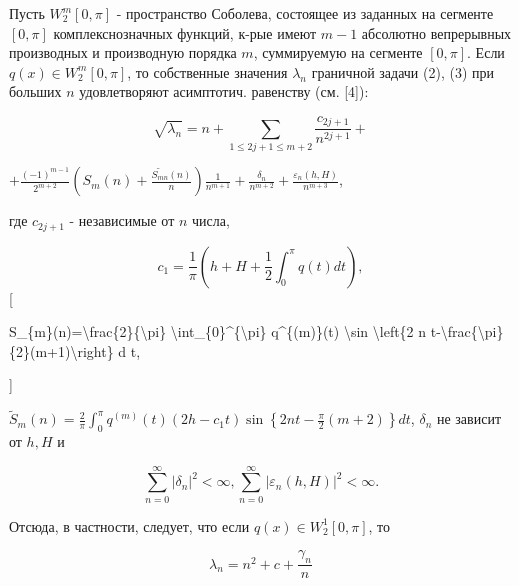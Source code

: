\documentclass[10pt]{article}
\begin{document}
Пусть $W_{2}^{m}[0, \pi]$ - пространство Соболева, состоящее из заданных на сегменте $[0, \pi]$ комплекснозначных функций, к-рые имеют $m-1$ абсолютно вепрерывных производных и производную порядка $m$, суммируемую на сегменте $[0, \pi]$. Если $q(x) \in W_{2}^{m}[0, \pi]$, то собственные значения $\lambda_{n}$ граничной задачи (2), (3) при больших $n$ удовлетворяют асимптотич. равенству (см. [4]):



\[

\sqrt{\lambda_{n}}=n+\sum_{1 \leqslant 2 j+1 \leqslant m+2} \frac{c_{2 j+1}}{n^{2 j+1}}+

\]



$+\frac{(-1)^{m-1}}{2^{m+2}}\left(S_{m}(n)+\frac{\tilde{S_{m n}}(n)}{n}\right) \frac{1}{n^{m+1}}+\frac{\delta_{n}}{n^{m+2}}+\frac{\varepsilon_{n}(h, H)}{n^{m+3}}$,



где $c_{2 j+1}$ - независимые от $n$ числа,



\[

c_{1}=\frac{1}{\pi}\left(h+H+\frac{1}{2} \int_{0}^{\pi} q(t) d t\right),

\][



S\_\{m\}(n)=\textbackslash frac\{2\}\{\textbackslash pi\} \textbackslash int\_\{0\}\^{}\{\textbackslash pi\} q\^{}\{(m)\}(t) \textbackslash sin \textbackslash left\{2 n t-\textbackslash frac\{\textbackslash pi\}\{2\}(m+1)\textbackslash right\} d t,

]



$\tilde{S}_{m}(n)=\frac{2}{\pi} \int_{0}^{\pi} q^{(m)}(t)\left(2 h-c_{1} t\right) \sin \left\{2 n t-\frac{\pi}{2}(m+2)\right\} d t$, $\delta_{n}$ не зависит от $h, H$ и



\[

\sum_{n=0}^{\infty}\left|\delta_{n}\right|^{2}<\infty, \sum_{n=0}^{\infty}\left|\varepsilon_{n}(h, H)\right|^{2}<\infty .

\]



Отсюда, в частности, следует, что если $q(x) \in W_{2}^{1}[0, \pi]$, то



\[

\lambda_{n}=n^{2}+c+\frac{\gamma_{n}}{n}

\]
\end{document}
